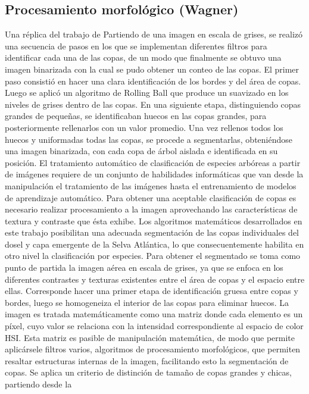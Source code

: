 \subsection{Procesamiento morfológico (Wagner)}
Una réplica del trabajo de \cite{ferreira_tree_2019}
Partiendo de una imagen en escala de grises, se realizó una secuencia de pasos en los que se implementan diferentes filtros para identificar cada una de las copas, de un modo que finalmente se obtuvo una imagen binarizada con la cual se pudo obtener un conteo de las copas. El primer paso consistió en hacer una clara identificación de los bordes y del área de copas. Luego se aplicó un algoritmo de Rolling Ball \cite{sternberg_biomedical_1983} que produce un suavizado en los niveles de grises dentro de las copas. En una siguiente etapa, distinguiendo copas grandes de pequeñas, se identificaban huecos en las copas grandes, para posteriormente rellenarlos con un valor promedio. Una vez rellenos todos los huecos y uniformadas todas las copas, se procede a segmentarlas, obteniéndose una imagen binarizada, con cada copa de árbol aislada e identificada en su posición.
El tratamiento automático de clasificación de especies arbóreas a partir de imágenes requiere de un conjunto de habilidades informáticas que van desde la manipulación el tratamiento de
las imágenes hasta el entrenamiento de modelos de aprendizaje automático. Para obtener una
aceptable clasificación de copas es necesario realizar procesamiento a la imagen
aprovechando las características de textura y contraste que ésta exhibe. Los algoritmos
matemáticos desarrollados en este trabajo posibilitan una adecuada segmentación de las
copas individuales del dosel y capa emergente de la Selva Atlántica, lo que consecuentemente
habilita en otro nivel la clasificación por especies. Para obtener el segmentado se toma como
punto de partida la imagen aérea en escala de grises, ya que se enfoca en los diferentes
contrastes y texturas existentes entre el área de copas y el espacio entre ellas. Corresponde
hacer una primer etapa de identificación gruesa entre copas y bordes, luego se homogeneiza el
interior de las copas para eliminar huecos. La imagen es tratada matemáticamente como una
matriz donde cada elemento es un píxel, cuyo valor se relaciona con la intensidad
correspondiente al espacio de color HSI. Esta matriz es pasible de manipulación matemática,
de modo que permite aplicársele filtros varios, algoritmos de procesamiento morfológicos, que
permiten resaltar estructuras internas de la imagen, facilitando esto la segmentación de copas.
Se aplica un criterio de distinción de tamaño de copas grandes y chicas, partiendo desde la
